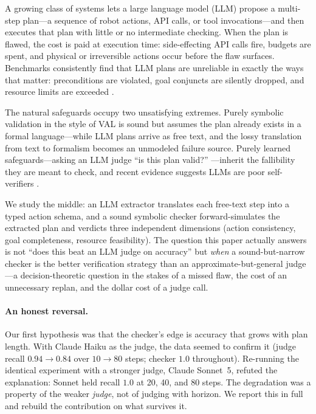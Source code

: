 \documentclass[letterpaper]{article}
\begin{document}
A growing class of systems lets a large language model (LLM) propose a
multi-step plan---a sequence of robot actions, API calls, or tool
invocations---and then executes that plan with little or no intermediate
checking. When the plan is flawed, the cost is paid at execution time:
side-effecting API calls fire, budgets are spent, and physical or
irreversible actions occur before the flaw surfaces. Benchmarks consistently
find that LLM plans are unreliable in exactly the ways that matter:
preconditions are violated, goal conjuncts are silently dropped, and resource
limits are exceeded \citep{valmeekam2023planbench,kambhampati2024llmmodulo}.

The natural safeguards occupy two unsatisfying extremes. Purely symbolic
validation in the style of \textsc{VAL} \citep{howey2004val} is sound but
assumes the plan already exists in a formal language---while LLM plans arrive
as free text, and the lossy translation from text to formalism becomes an
unmodeled failure source. Purely learned safeguards---asking an LLM judge
``is this plan valid?'' \citep{zheng2023judging}---inherit the fallibility
they are meant to check, and recent evidence suggests LLMs are poor
self-verifiers \citep{huang2024cannot,stechly2024selfverification}.

We study the middle: an LLM extractor translates each free-text step into a
typed action schema, and a sound symbolic checker forward-simulates the
extracted plan and verdicts three independent dimensions (action
consistency, goal completeness, resource feasibility). The question this
paper actually answers is not ``does this beat an LLM judge on accuracy''
but \emph{when} a sound-but-narrow checker is the better verification
strategy than an approximate-but-general judge---a decision-theoretic
question in the stakes of a missed flaw, the cost of an unnecessary replan,
and the dollar cost of a judge call.

\paragraph{An honest reversal.} Our first hypothesis was that the checker's
edge is accuracy that grows with plan length. With Claude Haiku as the
judge, the data seemed to confirm it (judge recall $0.94\!\to\!0.84$ over
$10\!\to\!80$ steps; checker $1.0$ throughout). Re-running the identical
experiment with a stronger judge, Claude Sonnet~5, refuted the
explanation: Sonnet held recall $1.0$ at 20, 40, and 80 steps. The
degradation was a property of the weaker \emph{judge}, not of judging with
horizon. We report this in full and rebuild the contribution on what
survives it.
\end{document}
